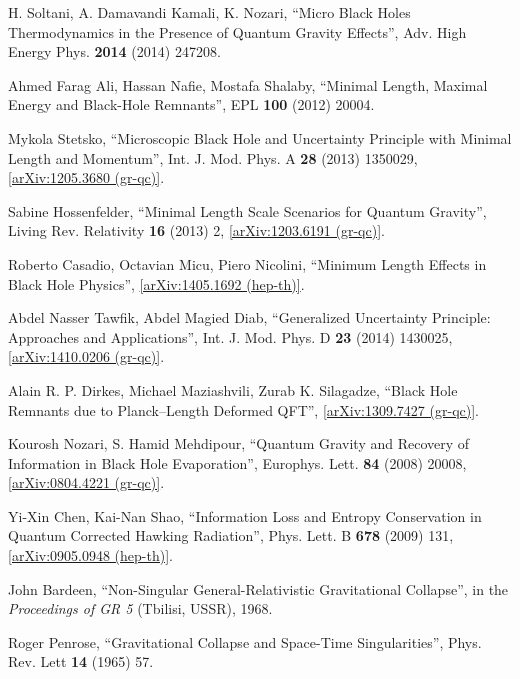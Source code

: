 \documentclass[12pt]{article}
\newcommand{\2}{$^2$}
\newcommand{\3}{$^3$}
\newcommand{\4}{$_4$}
\newcommand{\5}{$_5$}
\begin{document}
\begin{thebibliography}{400}
H. Soltani, A. Damavandi Kamali, K. Nozari, ``Micro Black Holes Thermodynamics in the Presence of Quantum Gravity Effects'', Adv. High Energy Phys. \textbf{2014} (2014) 247208.

Ahmed Farag Ali, Hassan Nafie, Mostafa Shalaby, ``Minimal Length, Maximal Energy and Black-Hole Remnants'', EPL \textbf{100} (2012) 20004. 

Mykola Stetsko, ``Microscopic Black Hole and Uncertainty Principle with Minimal Length and Momentum'', Int. J. Mod. Phys. A \textbf{28} (2013) 1350029, \href{http://arxiv.org/abs/1205.3680}{[arXiv:1205.3680 (gr-qc)]}.

Sabine Hossenfelder, ``Minimal Length Scale Scenarios for Quantum Gravity'', 	Living Rev. Relativity \textbf{16} (2013) 2, \href{http://arxiv.org/abs/1203.6191}{[arXiv:1203.6191 (gr-qc)]}. 

Roberto Casadio, Octavian Micu, Piero Nicolini, ``Minimum Length Effects in Black Hole Physics'', \href{http://arxiv.org/abs/1405.1692}{[arXiv:1405.1692 (hep-th)]}.

Abdel Nasser Tawfik, Abdel Magied Diab, ``Generalized Uncertainty Principle: Approaches and Applications'', Int. J. Mod. Phys. D \textbf{23} (2014) 1430025, \href{http://arxiv.org/abs/1410.0206}{[arXiv:1410.0206 (gr-qc)]}.

Alain R. P. Dirkes, Michael Maziashvili, Zurab K. Silagadze, ``Black Hole Remnants due to Planck--Length Deformed QFT'', \href{http://arxiv.org/abs/1309.7427}{[arXiv:1309.7427 (gr-qc)]}.

Kourosh Nozari, S. Hamid Mehdipour, ``Quantum Gravity and Recovery of Information in Black Hole Evaporation'', Europhys. Lett. \textbf{84} (2008) 20008, \href{http://arxiv.org/abs/0804.4221}{[arXiv:0804.4221 (gr-qc)]}.

Yi-Xin Chen, Kai-Nan Shao, ``Information Loss and Entropy Conservation in Quantum Corrected Hawking Radiation'', Phys. Lett. B \textbf{678} (2009) 131, \href{http://arxiv.org/abs/0905.0948}{[arXiv:0905.0948 (hep-th)]}.


John Bardeen, ``Non-Singular General-Relativistic Gravitational Collapse'',  in the \emph{Proceedings of GR 5} (Tbilisi, USSR), 1968.

Roger Penrose, ``Gravitational Collapse and Space-Time Singularities'', Phys. Rev. Lett \textbf{14} (1965) 57.


\end{thebibliography}
\end{document}
